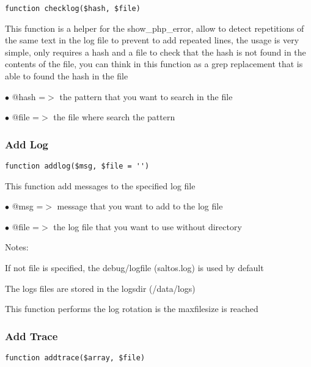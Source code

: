 \documentclass[a4paper]{article}
\begin{document}
\begin{lstlisting}
function checklog($hash, $file)
\end{lstlisting}

This function is a helper for the show\_php\_error, allow to detect repetitions
of the same text in the log file to prevent to add repeated lines, the usage
is very simple, only requires a hash and a file to check that the hash is not
found in the contents of the file, you can think in this function as a grep
replacement that is able to found the hash in the file

\begin{compactitem}
\item[\color{myblue}$\bullet$] @hash =$>$ the pattern that you want to search in the file
\item[\color{myblue}$\bullet$] @file =$>$ the file where search the pattern
\end{compactitem}

\hypertarget{toc162}{}
\subsubsection{Add Log}

\begin{lstlisting}
function addlog($msg, $file = '')
\end{lstlisting}

This function add messages to the specified log file

\begin{compactitem}
\item[\color{myblue}$\bullet$] @msg  =$>$ message that you want to add to the log file
\item[\color{myblue}$\bullet$] @file =$>$ the log file that you want to use without directory
\end{compactitem}

Notes:

If not file is specified, the debug/logfile (saltos.log) is used by default

The logs files are stored in the logsdir (/data/logs)

This function performs the log rotation is the maxfilesize is reached

\hypertarget{toc163}{}
\subsubsection{Add Trace}

\begin{lstlisting}
function addtrace($array, $file)
\end{lstlisting}
\end{document}

